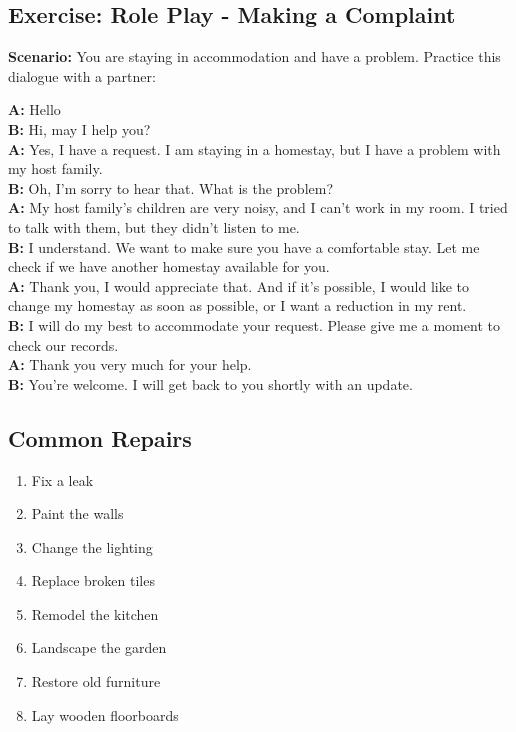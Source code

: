 \subsection{Exercise: Role Play - Making a Complaint}

\textbf{Scenario:} You are staying in accommodation and have a problem. Practice this dialogue with a partner:

\begin{tcolorbox}[colback=yellow!5, colframe=yellow!30, title=Sample Dialogue]
\textbf{A:} Hello\\
\textbf{B:} Hi, may I help you?\\
\textbf{A:} Yes, I have a request. I am staying in a homestay, but I have a problem with my host family.\\
\textbf{B:} Oh, I'm sorry to hear that. What is the problem?\\
\textbf{A:} My host family's children are very noisy, and I can't work in my room. I tried to talk with them, but they didn't listen to me.\\
\textbf{B:} I understand. We want to make sure you have a comfortable stay. Let me check if we have another homestay available for you.\\
\textbf{A:} Thank you, I would appreciate that. And if it's possible, I would like to change my homestay as soon as possible, or I want a reduction in my rent.\\
\textbf{B:} I will do my best to accommodate your request. Please give me a moment to check our records.\\
\textbf{A:} Thank you very much for your help.\\
\textbf{B:} You're welcome. I will get back to you shortly with an update.
\end{tcolorbox}

\subsection{Common Repairs}
\begin{enumerate}
    \item Fix a leak
    \item Paint the walls
    \item Change the lighting
    \item Replace broken tiles
    \item Remodel the kitchen
    \item Landscape the garden
    \item Restore old furniture
    \item Lay wooden floorboards
\end{enumerate}

